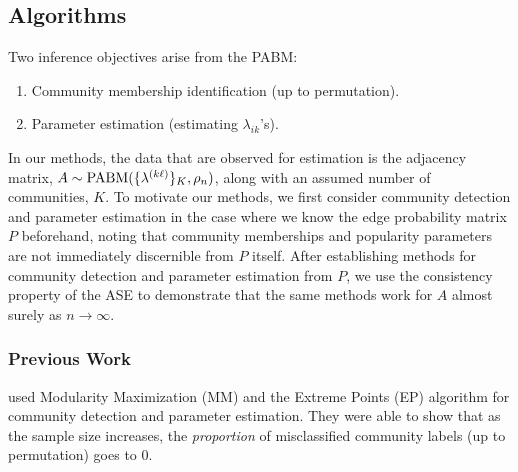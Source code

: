 \documentclass[
  12pt,
]{article}
\providecommand{\tightlist}{%
  \setlength{\itemsep}{0pt}\setlength{\parskip}{0pt}}
\theoremstyle{definition}
\theoremstyle{definition}
\theoremstyle{definition}
\theoremstyle{definition}
\theoremstyle{remark}
\begin{document}
\hypertarget{algorithms}{%
\subsection{Algorithms}\label{algorithms}}

Two inference objectives arise from the PABM:

\begin{enumerate}
\def\labelenumi{\arabic{enumi}.}
\tightlist
\item
Community membership identification (up to permutation).
\item
Parameter estimation (estimating $\lambda_{ik}$'s).
\end{enumerate}

In our methods, the data that are observed for estimation is the adjacency matrix, \(A \sim \mathrm{PABM}(\{\lambda^{(k \ell)}\}_K, \rho_n)\), along with an assumed number of communities, \(K\).
To motivate our methods, we first consider community detection and parameter estimation in the case where we know the edge probability matrix \(P\) beforehand, noting that community memberships and popularity parameters are not immediately discernible from \(P\) itself.
After establishing methods for community detection and parameter estimation from \(P\), we use the consistency property of the ASE \citep{doi:10.1080/01621459.2012.699795,rubindelanchy2017statistical} to demonstrate that the same methods work for \(A\) almost surely as \(n \to \infty\).

\hypertarget{previous-work}{%
\subsubsection{Previous Work}\label{previous-work}}

\citet{307cbeb9b1be48299388437423d94bf1}
used Modularity Maximization (MM) and the Extreme Points (EP)
algorithm \citep{le2016} for community detection and parameter
estimation. They were able to show that as the sample size increases,
the \emph{proportion} of misclassified community labels (up to permutation)
goes to 0.
\end{document}
